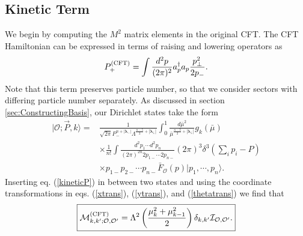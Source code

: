 \begin{subappendices}
\subsection{Kinetic Term} 
We begin by computing the $M^2$ matrix elements in the original CFT. The CFT 
Hamiltonian can be expressed in terms of raising and lowering operators as 
\begin{equation}
    P_+^{(\textrm{CFT})} = \int \frac{d^2 p}{(2\pi)^2} a^\dagger_p a_p \frac{p_\bot^2}{2p_-}. \label{kineticP}
\end{equation} 
Note that this term preserves particle number, so that we consider sectors with 
differing particle number separately. As discussed in section 
\ref{sec:ConstructingBasis}, our Dirichlet states take the form 
\begin{equation}
    \begin{aligned}
        | \mathcal{O};  \vec{P}, k \rangle = &\frac{1}{\sqrt{2\pi} P_-^{n + |\boldsymbol{\lambda}_-|} \Lambda^{\frac{n-5}{2} + |\boldsymbol{\lambda}_\bot|}}\int_0^{1} \frac{d\bar{\mu}^2}{\bar{\mu}^{\frac{n-3}{2} + |\boldsymbol{\lambda}_\bot|}} g_k(\bar{\mu}) \label{eqn:finalbasisstates}\\
        &\times \frac{1}{n!}\int \frac{d^2 p_1 \dotsb d^2 p_n}{(2\pi)^{2n} 2p_{1-} \dotsb 2p_{n-}} (2\pi)^3 \delta^3 \left( \sum_i p_i - P \right) \\
        &\times p_{1-} p_{2-} \dotsb p_{n-} \bar{F}_{\mathcal{O}}(p) | p_1, \dotsb, p_n \rangle.
    \end{aligned}
\end{equation} 
Inserting eq. (\ref{kineticP}) in between two states and using the coordinate 
transformations in eqs. (\ref{xtrans}), (\ref{ytrans}), and (\ref{thetatrans}) 
we find that 
\begin{equation}
    \begin{aligned}
        \boxed{{\cal M}^{(\textrm{CFT})}_{k, k'; \mathcal{O}, \mathcal{O}'} = \Lambda^2 \left( \frac{\mu_k^2 + \mu_{k-1}^2}{2} \right) \delta_{k, k'} \mathcal{I}_{ \mathcal{O}, \mathcal{O}'}.}
    \end{aligned}
\end{equation}


\end{subappendices}
